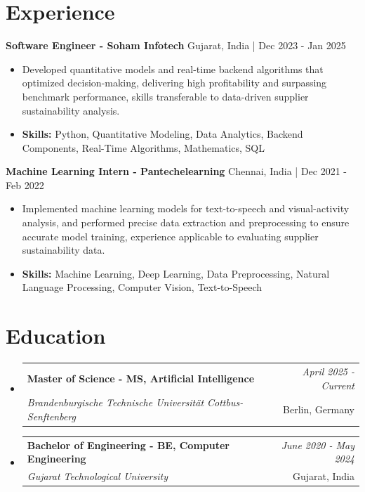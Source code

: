 \documentclass[a4paper,11pt]{article}
\makeatletter
\newcommand{\resumeSubheading}[4]{
\vspace{0.5mm}\item
    \begin{tabular*}{\linewidth}[t]{l@{\extracolsep{\fill}}r}
        \textbf{#1} & \textit{\footnotesize{#4}} \\
        \textit{\footnotesize{#3}} &  \footnotesize{#2}\\
    \end{tabular*}
    \vspace{-2.4mm}
}
\makeatother
\begin{document}
\section{\textbf{Experience}}


\vspace{1mm}
  \textbf{Software Engineer - Soham Infotech} \hfill Gujarat, India | Dec 2023 - Jan 2025
\vspace{-1.5mm} %
\begin{itemize}
  \item Developed quantitative models and real-time backend algorithms that optimized decision-making, delivering high profitability and surpassing benchmark performance, skills transferable to data-driven supplier sustainability analysis.

\vspace{-2mm}
  \item \textbf{Skills:} Python, Quantitative Modeling, Data Analytics, Backend Components, Real-Time Algorithms, Mathematics, SQL
\end{itemize}

\vspace{1mm}
  \textbf{Machine Learning Intern - Pantechelearning} \hfill Chennai, India | Dec 2021 - Feb 2022
\vspace{-1.5mm} %
\begin{itemize}
  \item Implemented machine learning models for text-to-speech and visual-activity analysis, and performed precise data extraction and preprocessing to ensure accurate model training, experience applicable to evaluating supplier sustainability data.
\vspace{-2mm}
  \item \textbf{Skills:} Machine Learning, Deep Learning, Data Preprocessing, Natural Language Processing, Computer Vision, Text-to-Speech
\end{itemize}\section{\textbf{Education}}
\vspace{-0.4mm}

\begin{itemize}[leftmargin=0.15in, label={}]
\resumeSubheading
{Master of Science - MS, Artificial Intelligence }{Berlin, Germany}
{Brandenburgische Technische Universität Cottbus-Senftenberg  }{April 2025 - Current}

\vspace{1.0mm} %
\resumeSubheading
{Bachelor of Engineering - BE, Computer Engineering  }{Gujarat, India}
{Gujarat Technological University }{June 2020 - May 2024}

\end{itemize}
\end{document}
